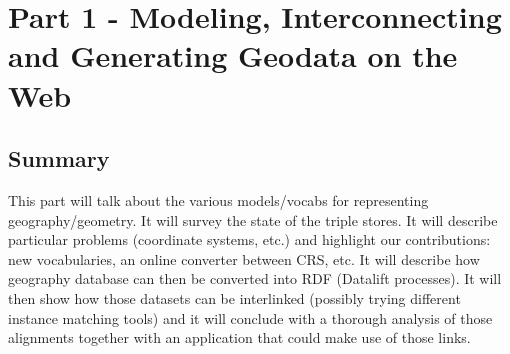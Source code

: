 \vspace{3cm}
\chapter*{Part 1 - Modeling, Interconnecting and Generating Geodata on the Web}
\label{part:part1}
 \vspace{10mm}
\section*{Summary}
This part will talk about the various models/vocabs for representing geography/geometry. It will survey the state of the triple stores. It will describe particular problems (coordinate systems, etc.) and highlight our contributions: new vocabularies, an online converter between CRS, etc. It will describe how geography database can then be converted into RDF (Datalift processes). It will then show how those datasets can be interlinked (possibly trying different instance matching tools) and it will conclude with a thorough analysis of those alignments together with an application that could make use of those links.
